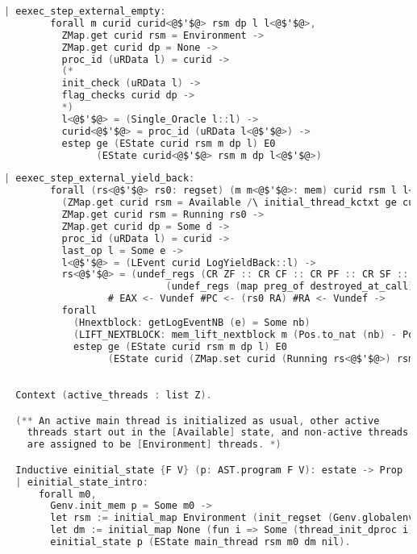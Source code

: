 \begin{lstlisting}[language=C]
    | eexec_step_external_empty:
        forall m curid curid<@$'$@> rsm dp l l<@$'$@>,
          ZMap.get curid rsm = Environment ->
          ZMap.get curid dp = None ->
          proc_id (uRData l) = curid ->
          (*
          init_check (uRData l) ->
          flag_checks curid dp ->
          *)
          l<@$'$@> = (Single_Oracle l::l) ->
          curid<@$'$@> = proc_id (uRData l<@$'$@>) ->
          estep ge (EState curid rsm m dp l) E0
                (EState curid<@$'$@> rsm m dp l<@$'$@>)
\end{lstlisting}

\begin{lstlisting}[language=C]
    | eexec_step_external_yield_back:
        forall (rs<@$'$@> rs0: regset) (m m<@$'$@>: mem) curid rsm l l<@$'$@> nb dp d e,
          (ZMap.get curid rsm = Available /\ initial_thread_kctxt ge curid l = Some rs0) \/
          ZMap.get curid rsm = Running rs0 ->
          ZMap.get curid dp = Some d ->
          proc_id (uRData l) = curid ->
          last_op l = Some e ->
          l<@$'$@> = (LEvent curid LogYieldBack::l) ->
          rs<@$'$@> = (undef_regs (CR ZF :: CR CF :: CR PF :: CR SF :: CR OF :: nil)
                            (undef_regs (map preg_of destroyed_at_call) rs0)) 
                  # EAX <- Vundef #PC <- (rs0 RA) #RA <- Vundef ->
          forall
            (Hnextblock: getLogEventNB (e) = Some nb)
            (LIFT_NEXTBLOCK: mem_lift_nextblock m (Pos.to_nat (nb) - Pos.to_nat (Mem.nextblock m) % nat) = m<@$'$@>),
            estep ge (EState curid rsm m dp l) E0
                  (EState curid (ZMap.set curid (Running rs<@$'$@>) rsm) m<@$'$@> dp l<@$'$@>).
\end{lstlisting}


\begin{lstlisting}[language=C]

  Context (active_threads : list Z).

  (** An active main thread is initialized as usual, other active
    threads start out in the [Available] state, and non-active threads
    are assigned to be [Environment] threads. *)

  Inductive einitial_state {F V} (p: AST.program F V): estate -> Prop :=
  | einitial_state_intro: 
      forall m0,
        Genv.init_mem p = Some m0 ->
        let rsm := initial_map Environment (init_regset (Genv.globalenv p)) active_threads in
        let dm := initial_map None (fun i => Some (thread_init_dproc i)) active_threads in
        einitial_state p (EState main_thread rsm m0 dm nil).
\end{lstlisting}

